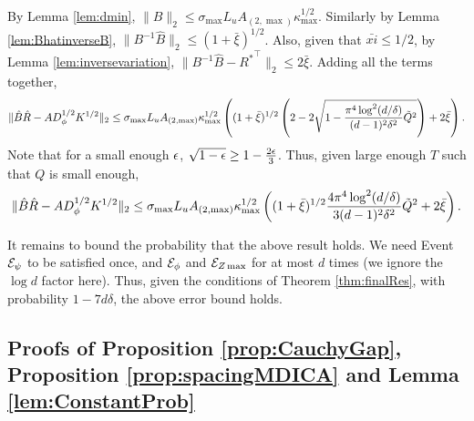 By Lemma \ref{lem:dmin}, 
 $ \|B\|_2 \le \sigma_{\max}L_uA_{(2,\max)}\kappa_{\max}^{1/2}$. 
Similarly by Lemma \ref{lem:BhatinverseB}, $\| B^{-1}\hat{B}\|_2 \le (1+\bar{\xi})^{1/2}$. 
Also, given that $\bar{xi} \le 1/2$, by Lemma \ref{lem:inversevariation}, $\|B^{-1}\hat{B} -{R^*}^{\top}\|_2 \le 2\bar{\xi}$.
Adding all the terms together,
\[
\| \hat{B}\hat{R} - AD_{\phi}^{1/2}K^{1/2}\|_2 \le \sigma_{\max}L_uA_{(2,\max)}\kappa_{\max}^{1/2}\left((1+\bar{\xi})^{1/2}\left(  2 - 2\sqrt{1-\frac{\pi^4 \log^2(d/\delta)}{(d-1)^2\delta^2} \tilde{Q}^2}\right) + 2\bar{\xi}\right).
\] 
Note that for a small enough $\epsilon$, $\sqrt{1-\epsilon} \ge 1-\frac{2\epsilon}{3}$. Thus, given large enough $T$ such that $Q$ is small enough,
\[
\| \hat{B}\hat{R} - AD_{\phi}^{1/2}K^{1/2}\|_2 \le \sigma_{\max}L_uA_{(2,\max)}\kappa_{\max}^{1/2}\left((1+\bar{\xi})^{1/2}\frac{4\pi^4 \log^2(d/\delta)}{3(d-1)^2\delta^2} \tilde{Q}^2+ 2\bar{\xi}\right).
\]

It remains to bound the probability that the above result holds.
We need Event $\mathcal{E}_{\psi}$ to be satisfied once, and $\mathcal{E}_{\phi}$ and $\mathcal{E}_{Z\max}$ for at most $d$ times (we ignore the $\log d$ factor here). 
Thus, given the conditions of Theorem \ref{thm:finalRes}, with probability $1-7d\delta$, the above error bound holds. 

\subsection{Proofs of Proposition \ref{prop:CauchyGap}, Proposition \ref{prop:spacingMDICA} and Lemma \ref{lem:ConstantProb}}
\label{sec:events}

